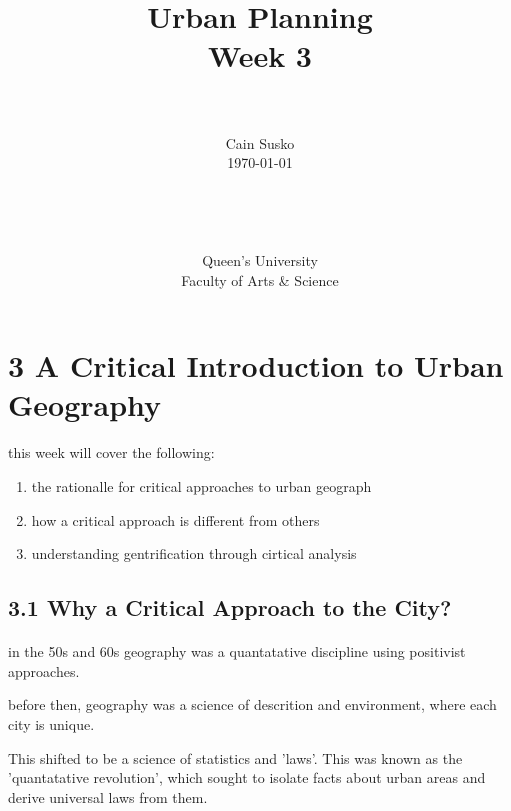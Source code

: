 \documentclass[12pt]{book}
\newcommand{\week}{Week 3}
\newcommand{\class}{Urban Planning}
\begin{document}
\date{}
\setlength{\parindent}{0em}  %

\title{\class\\\week}

\author{\\ \\ Cain Susko\\\today \\ \\ \\ \\ \\
Queen's University \\Faculty of Arts \& Science} 
 

\maketitle
\pagebreak


\section*{3 A Critical Introduction to Urban Geography}

this week will cover the following:
\begin{enumerate} 
        \item the rationalle for critical approaches to urban geograph
        \item how a critical approach is different from others
        \item understanding gentrification through cirtical analysis
\end{enumerate}


\subsection*{3.1 Why a Critical Approach to the City?}

\paragraph{}
in the 50s and 60s geography was a quantatative discipline using positivist approaches.

before then, geography was a science of descrition and environment, where each city is unique. 

This shifted to be a science of statistics and 'laws'.
This was known as the 'quantatative revolution', which sought to isolate facts about urban areas and derive
universal laws from them.
\end{document}
